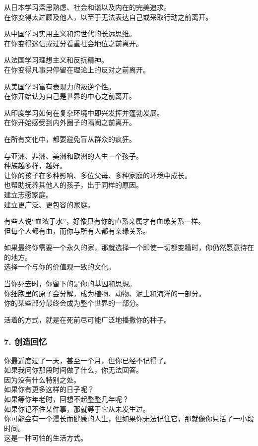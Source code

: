 \documentclass[
]{article}
\begin{document}
从日本学习深思熟虑、社会和谐以及内在的完美追求。\\
在你变得太过顾及他人，以至于无法表达自己或采取行动之前离开。

从中国学习实用主义和跨世代的长远思维。\\
在你变得迷信或过分看重社会地位之前离开。

从法国学习理想主义和反抗精神。\\
在你变得凡事只停留在理论上的反对之前离开。

从美国学习富有表现力的叛逆个性。\\
在你开始认为自己是世界的中心之前离开。

从印度学习如何在复杂环境中即兴发挥并蓬勃发展。\\
在你开始感受到内外圈子的隔阂之前离开。

在所有文化中，都要避免盲从群众的疯狂。

与亚洲、非洲、美洲和欧洲的人生一个孩子。\\
种族越多样，越好。\\
让你的孩子在多种影响、多位父母、多种家庭的环境中成长。\\
也帮助抚养其他人的孩子，出于同样的原因。\\
建立志愿家庭。\\
建立更广泛、更包容的家庭。

有些人说``血浓于水''，好像只有你的直系亲属才有血缘关系一样。\\
但每个人都有血，而你与所有人都有亲缘关系。

如果最终你需要一个永久的家，那就选择一个即使一切都变糟时，你仍然愿意待在的地方。\\
选择一个与你的价值观一致的文化。

当你死去时，你留下的是你的基因和思想。\\
你细胞里的原子会分解，成为植物、动物、泥土和海洋的一部分。\\
你的某些部分最终会成为整个世界的一部分。

活着的方式，就是在死前尽可能广泛地播撒你的种子。

\subsubsection{7. 创造回忆}\label{7-ux521bux9020ux56deux5fc6}

你最近度过了一天，甚至一个月，但你已经不记得了。\\
如果我问你那段时间做了什么，你无法回答。\\
因为没有什么特别之处。\\
如果你有更多这样的日子呢？\\
如果等你年老时，回想不起整整几年呢？\\
如果你记不住某件事，那就等于它从未发生过。\\
你可能会有一个漫长而健康的人生，但如果你无法记住它，那就像你只活了一小段时间。\\
这是一种可怕的生活方式。
\end{document}
